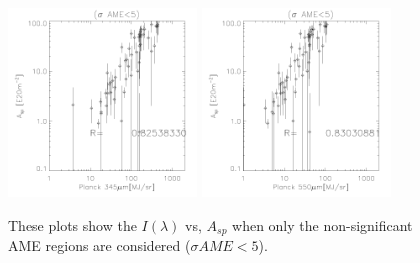 \begin{figure}[!htb]
  \includegraphics[width=50mm]{IRIntMWAmp/planck857_Asp_nosp.pdf}
  \includegraphics[width=50mm]{IRIntMWAmp/planck545_Asp_nosp.pdf}
\caption{These plots show the $I({\lambda})$ vs, $A_{sp}$ when only the non-significant AME regions are considered ($\sigma AME < 5$). 
}
\label{fig:IRIntMWAmpnosp}
\end{figure}

